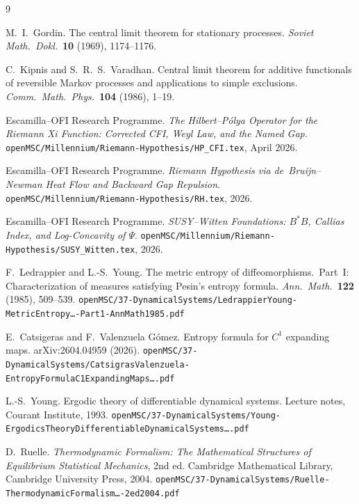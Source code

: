 \documentclass[
]{article}
\begin{document}
\begin{thebibliography}{9}

M.~I.~Gordin.
The central limit theorem for stationary processes.
\textit{Soviet Math.\ Dokl.}\ \textbf{10} (1969), 1174--1176.

C.~Kipnis and S.~R.~S.~Varadhan.
Central limit theorem for additive functionals of reversible Markov
processes and applications to simple exclusions.
\textit{Comm.\ Math.\ Phys.}\ \textbf{104} (1986), 1--19.

Escamilla--OFI Research Programme.
\textit{The Hilbert--P\'olya Operator for the Riemann Xi Function:
Corrected CFI, Weyl Law, and the Named Gap}.
\texttt{openMSC/Millennium/Riemann-Hypothesis/HP\_CFI.tex}, April 2026.

Escamilla--OFI Research Programme.
\textit{Riemann Hypothesis via de~Bruijn--Newman Heat Flow and
Backward Gap Repulsion}.
\texttt{openMSC/Millennium/Riemann-Hypothesis/RH.tex}, 2026.

Escamilla--OFI Research Programme.
\textit{SUSY--Witten Foundations: $B^*B$, Callias Index, and
Log-Concavity of $\Psi$}.
\texttt{openMSC/Millennium/Riemann-Hypothesis/SUSY\_Witten.tex}, 2026.

F.~Ledrappier and L.-S.~Young.
The metric entropy of diffeomorphisms.\ Part~I:
Characterization of measures satisfying Pesin's entropy formula.
\textit{Ann.\ Math.}\ \textbf{122} (1985), 509--539.
\texttt{openMSC/37-DynamicalSystems/LedrappierYoung-MetricEntropy\ldots-Part1-AnnMath1985.pdf}

E.~Catsigeras and F.~Valenzuela G\'omez.
Entropy formula for $C^1$ expanding maps.
arXiv:2604.04959 (2026).
\texttt{openMSC/37-DynamicalSystems/CatsigrasValenzuela-EntropyFormulaC1ExpandingMaps\ldots.pdf}

L.-S.~Young.
Ergodic theory of differentiable dynamical systems.
Lecture notes, Courant Institute, 1993.
\texttt{openMSC/37-DynamicalSystems/Young-ErgodicsTheoryDifferentiableDynamicalSystems\ldots.pdf}

D.~Ruelle.
\textit{Thermodynamic Formalism: The Mathematical Structures of
Equilibrium Statistical Mechanics}, 2nd ed.
Cambridge Mathematical Library, Cambridge University Press, 2004.
\texttt{openMSC/37-DynamicalSystems/Ruelle-ThermodynamicFormalism\ldots-2ed2004.pdf}


\end{thebibliography}
\end{document}
